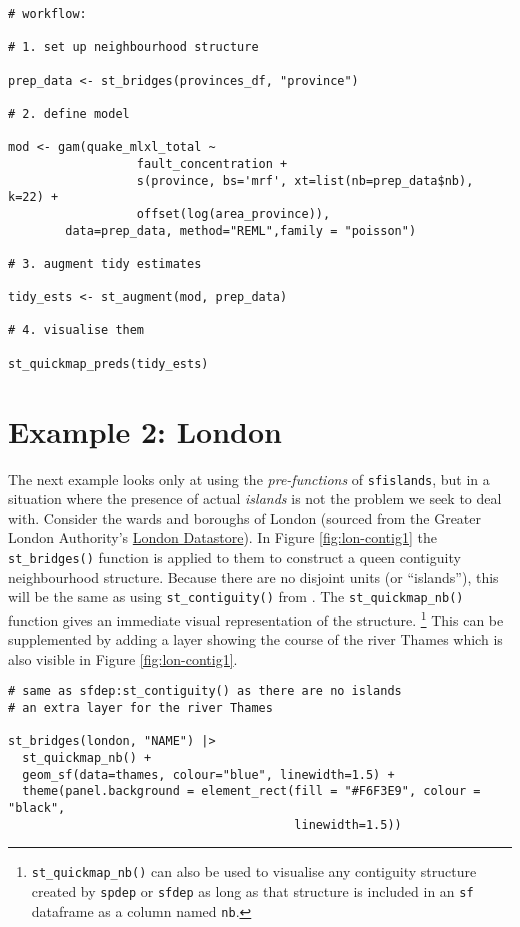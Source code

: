\begin{verbatim}
# workflow:

# 1. set up neighbourhood structure

prep_data <- st_bridges(provinces_df, "province")

# 2. define model

mod <- gam(quake_mlxl_total ~ 
                  fault_concentration +
                  s(province, bs='mrf', xt=list(nb=prep_data$nb), k=22) +
                  offset(log(area_province)),
        data=prep_data, method="REML",family = "poisson")

# 3. augment tidy estimates

tidy_ests <- st_augment(mod, prep_data)

# 4. visualise them

st_quickmap_preds(tidy_ests)
\end{verbatim}

\hypertarget{example-2-london}{%
\section{Example 2: London}\label{example-2-london}}

The next example looks only at using the \emph{pre-functions} of \texttt{sfislands}, but in a situation where the presence of actual \emph{islands} is not the problem we seek to deal with. Consider the wards and boroughs of London (sourced from the Greater London Authority's \href{https://data.london.gov.uk/}{London Datastore}). In Figure \ref{fig:lon-contig1} the \texttt{st\_bridges()}
function is applied to them to construct a queen contiguity
neighbourhood structure. Because there are no disjoint units (or
``islands''), this will be the same as using \texttt{st\_contiguity()} from
. The \texttt{st\_quickmap\_nb()} function gives an immediate
visual representation of the structure. \footnote{\texttt{st\_quickmap\_nb()} can also be used to visualise any contiguity structure created by \texttt{spdep} or \texttt{sfdep} as long as that structure is included in an \texttt{sf} dataframe as a column named \texttt{nb}.} This can be supplemented by
adding a layer showing the course of the river Thames which is also visible in Figure \ref{fig:lon-contig1}.

\begin{verbatim}
# same as sfdep:st_contiguity() as there are no islands
# an extra layer for the river Thames

st_bridges(london, "NAME") |> 
  st_quickmap_nb() + 
  geom_sf(data=thames, colour="blue", linewidth=1.5) + 
  theme(panel.background = element_rect(fill = "#F6F3E9", colour = "black", 
                                        linewidth=1.5))
\end{verbatim}

